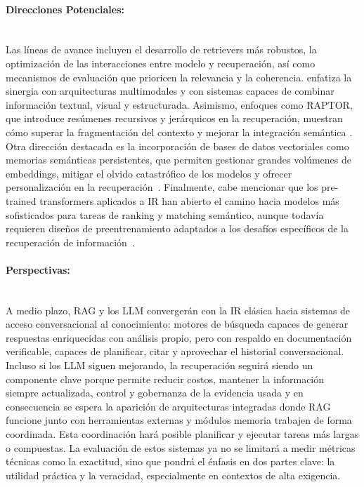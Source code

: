 \paragraph{Direcciones Potenciales:}  
\mbox{}\\
Las líneas de avance incluyen el desarrollo de retrievers más robustos, la optimización de las interacciones entre modelo y recuperación, 
así como mecanismos de evaluación que prioricen la relevancia y la coherencia. \textcite{ramdurai2025llm} enfatiza la sinergia con arquitecturas multimodales y con sistemas 
capaces de combinar información textual, visual y estructurada. Asimismo, enfoques como RAPTOR, que introduce resúmenes recursivos y jerárquicos en la recuperación,
muestran cómo superar la fragmentación del contexto y mejorar la integración semántica \parencite{sarthi2024raptor}. Otra dirección destacada es la incorporación de 
bases de datos vectoriales como memorias semánticas persistentes, que permiten gestionar grandes volúmenes de embeddings, mitigar el olvido catastrófico de los modelos
 y ofrecer personalización en la recuperación~\parencite{jing2024vecdb}.
Finalmente, cabe mencionar que los pre-trained transformers aplicados a IR han abierto el camino hacia modelos más sofisticados para tareas de ranking y matching semántico, 
aunque todavía requieren diseños de preentrenamiento adaptados a los desafíos específicos de la recuperación de información~\parencite{fan2021pretraining}.

\paragraph{Perspectivas:} 
\mbox{}\\
A medio plazo, RAG y los LLM convergerán con la IR clásica hacia sistemas de acceso conversacional al conocimiento: motores de búsqueda capaces de generar respuestas enriquecidas con análisis propio,
pero con respaldo en documentación verificable, capaces de planificar, citar y aprovechar el historial conversacional. Incluso si los LLM siguen mejorando, la recuperación seguirá 
siendo un componente clave porque permite reducir costos, mantener la información siempre actualizada, control y gobernanza de la evidencia usada y en consecuencia se espera la aparición de arquitecturas integradas donde RAG funcione junto con
herramientas externas y módulos memoria trabajen de forma coordinada. Esta coordinación hará posible planificar y ejecutar tareas más largas o compuestas. La evaluación de estos sistemas ya no se limitará a medir métricas técnicas como la exactitud, sino que pondrá el énfasis en
 dos partes clave: la utilidad práctica y la veracidad, especialmente en contextos de alta exigencia.

